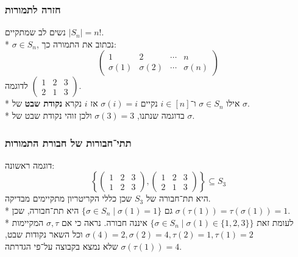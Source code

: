 \subsubsection{חזרה לתמורות}
נשים לב שמתקיים $|S_n| = n !$. \\* %
$\sigma \in S_n$, נכתוב את התמורה כך:
\[
	\begin{pmatrix}
		1 & 2 & \cdots & n \\
		\sigma(1) & \sigma(2) & \cdots & \sigma(n)
	\end{pmatrix}
\]
לדוגמה $\begin{pmatrix}
	1 & 2 & 3 \\
	2 & 1 & 3
\end{pmatrix}$. \\*
אילו $\sigma \in S_n$ ו־$i \in [n]$ נקיים $\sigma(i) = i$ אז $i$ נקרא \textbf{נקודת שבט} של $\sigma$. \\*
בדוגמה שנתנו, $\sigma(3) = 3$ ולכן זוהי נקודת שבט של $\sigma$.

\subsubsection{תתי־חבורות של חבורת התמורות}
דוגמה ראשונה:
\[
	\left\{
		\begin{pmatrix}
			1 & 2 & 3 \\
			1 & 2 & 3
		\end{pmatrix},
		\begin{pmatrix}
			1 & 2 & 3 \\
			2 & 1 & 3
		\end{pmatrix}
	\right\}
	\subseteq S_3
\]
היא תת־חבורה של $S_3$ שכן כללי הקריטריון מתקיימים מבדיקה. \\*
גם $\{ \sigma \in S_n \mid \sigma(1) = 1 \}$ היא תת־חבורה, שכן $\sigma(\tau(1)) = \tau(\sigma(1)) = 1$. \\*
לעומת זאת $\{ \sigma \in S_n \mid \sigma(1) \in \{1, 2, 3\}\}$ איננה חבורה. נראה כי אם $\sigma, \tau$ המקיימות $\sigma(4) = 2, \sigma(2) = 4, \tau(2) = 1, \tau(1) = 2$
וכל השאר נקודות שבט, $\sigma(\tau(1)) = 4$ שלא נמצא בקבוצה על־פי הגדרתה.

